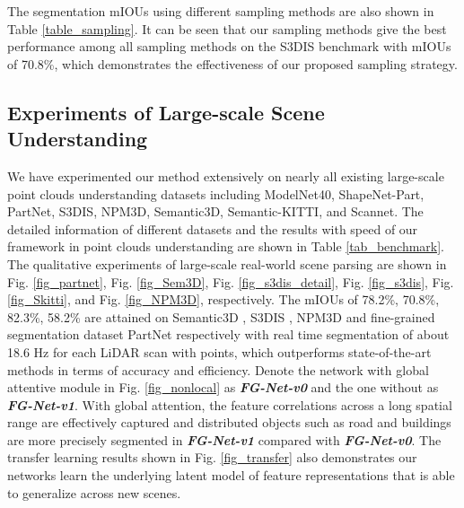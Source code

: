 \documentclass[journal]{IEEEtran}
\begin{document}
The segmentation mIOUs using different sampling methods are also shown in Table \ref{table_sampling}. It can be seen that our sampling methods give the best performance among all sampling methods on the S3DIS benchmark with mIOUs of 70.8\%, which demonstrates the effectiveness of our proposed sampling strategy.







\subsection{Experiments of Large-scale Scene Understanding}
We have experimented our method extensively on nearly all existing large-scale point clouds understanding datasets including ModelNet40\cite{wu20153d}, ShapeNet-Part\cite{yi2016scalable}, PartNet\cite{mo2019partnet}, S3DIS\cite{armeni20163d}, NPM3D\cite{roynard2018paris}, Semantic3D\cite{hackel2017semantic3d}, Semantic-KITTI\cite{behley2019semantickitti}, and Scannet\cite{dai2017scannet}. The detailed information of different datasets and the results with speed of our framework in point clouds understanding are shown in Table \ref{tab_benchmark}. The qualitative experiments of large-scale real-world scene parsing are shown in Fig. \ref{fig_partnet}, Fig. \ref{fig_Sem3D}, Fig. \ref{fig_s3dis_detail}, Fig. \ref{fig_s3dis}, Fig. \ref{fig_Skitti}, and Fig. \ref{fig_NPM3D}, respectively. The mIOUs of 78.2\%, 70.8\%, 82.3\%, 58.2\% are attained on Semantic3D \cite{hackel2017semantic3d}, S3DIS \cite{armeni20163d}, NPM3D \cite{roynard2018paris} and fine-grained segmentation dataset PartNet \cite{mo2019partnet} respectively with real time segmentation of about 18.6 Hz for each LiDAR scan with  points, which outperforms state-of-the-art methods in terms of accuracy and efficiency. Denote the network with global attentive module in Fig. \ref{fig_nonlocal} as \textit{\textbf{FG-Net-v0}} and the one without as \textit{\textbf{FG-Net-v1}}. With global attention, the feature correlations across a long spatial range are effectively captured and distributed objects such as road and buildings are more precisely segmented in \textit{\textbf{FG-Net-v1}} compared with \textit{\textbf{FG-Net-v0}}. The transfer learning results shown in Fig. \ref{fig_transfer} also demonstrates our networks learn the underlying latent model of feature representations that is able to generalize across new scenes.
\end{document}
